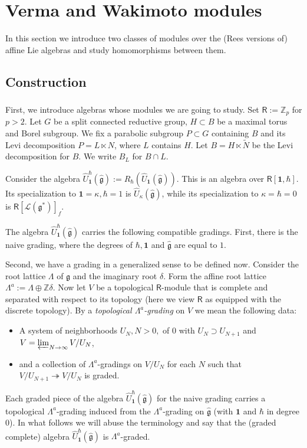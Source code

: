 \documentclass{amsart}
\theoremstyle{definition}
\newcommand{\sss}{\subsubsection{}}
\newcommand{\Ring}{\mathsf{R}}
\newcommand{\g}{\mathfrak{g}}
\newcommand{\hg}{\hat{\mathfrak{g}}}
\newcommand{\Z}{\mathbb{Z}}
\newcommand{\Loop}{\mathscr{L}}
\newcommand{\bone}{\mathbf{1}}
\numberwithin{equation}{section}
\begin{document}
\section{Verma and Wakimoto modules}\label{S_Verma_Wak}
In this section we introduce two classes of modules over the (Rees versions of) affine Lie algebras and study homomorphisms between them. 
\subsection{Construction}
\sss First, we introduce algebras whose modules we are going to study. Set $\Ring:=\Z_p$ for $p>2$. Let $G$ be a split connected reductive group, $H\subset B$ be a maximal torus and Borel subgroup. We fix a parabolic subgroup $P\subset G$ containing $B$ and its Levi decomposition $P=L\ltimes N$, where $L$ contains $H$. Let $B=H\ltimes \tilde{N}$ be the Levi decomposition for $B$.
We write $B_L$ for $B\cap L$.

Consider the algebra $\widehat{U}^\hbar_{\bone}(\hg):=R_\hbar(\widehat{U}_{\bone}(\hg))$. This is an algebra over $\Ring[\mathbf{1},\hbar]$. Its specialization to $\bone=\kappa,\hbar=1$ is $\widehat{U}_\kappa(\hg)$, while its specialization to $\kappa=\hbar=0$ is $\Ring[\Loop(\g^*)]_f$.

The algebra $\widehat{U}^\hbar_{\bone}(\hg)$ carries the following 
compatible gradings. First, there is the naive grading, where 
the degrees of $\hbar,\bone$ and $\hg$ are equal to $1$. 

Second, we have a grading in a generalized sense to be defined now. Consider the root lattice $\Lambda$ of $\g$ and the imaginary root $\delta$. Form the affine root lattice $\Lambda^a:=\Lambda\oplus \Z\delta$.
Now let $V$ be a topological $\Ring$-module that is complete and separated with respect to its topology (here we view $\Ring$ as equipped with the discrete topology). By a {\it topological $\Lambda^a$-grading} on $V$
we mean the following data: 
\begin{itemize}
\item A system of neighborhoods $U_N, N>0,$ of $0$ with $U_N\supset U_{N+1}$ and $V=\varprojlim_{N\rightarrow \infty}V/U_N$,
\item and a collection of  $\Lambda^a$-gradings on $V/U_N$ for each $N$ such that $V/U_{N+1}\twoheadrightarrow V/U_N$ is graded. 
\end{itemize}

Each graded piece of the  algebra $\widehat{U}_{\bone}^\hbar(\hg)$ for the naive grading carries a topological $\Lambda^a$-grading induced from the $\Lambda^a$-grading on $\hg$ (with $\bone$ and $\hbar$ in degree $0$). In what follows we will abuse the terminology and say that the (graded complete) algebra $\widehat{U}_{\bone}^\hbar(\hg)$ is $\Lambda^a$-graded.  
\end{document}

